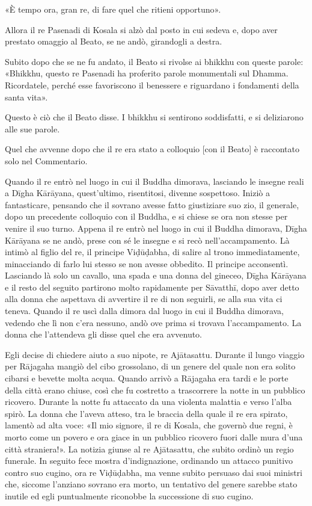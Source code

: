 «È tempo ora, gran re, di fare quel che ritieni opportuno».

Allora il re Pasenadi di Kosala si alzò dal posto in cui sedeva e, dopo aver
prestato omaggio al Beato, se ne andò, girandogli a destra.

Subito dopo che se ne fu andato, il Beato si rivolse ai bhikkhu con queste
parole: «Bhikkhu, questo re Pasenadi ha proferito parole monumentali sul Dhamma.
Ricordatele, perché esse favoriscono il benessere e riguardano i fondamenti
della santa vita».

Questo è ciò che il Beato disse. I bhikkhu si sentirono soddisfatti, e si
deliziarono alle sue parole.


 Quel che avvenne dopo che il re era stato a
colloquio [con il Beato] è raccontato solo nel Commentario.

 Quando il re entrò nel luogo in cui il Buddha
dimorava, lasciando le insegne reali a Dīgha Kārāyana, quest’ultimo,
risentitosi, divenne sospettoso. Iniziò a fantasticare, pensando che il sovrano
avesse fatto giustiziare suo zio, il generale, dopo un precedente colloquio con
il Buddha, e si chiese se ora non stesse per venire il suo turno. Appena il re
entrò nel luogo in cui il Buddha dimorava, Dīgha Kārāyana se ne andò, prese con
sé le insegne e si recò nell’accampamento. Là intimò al figlio del re, il
principe Viḍūḍabha, di salire al trono immediatamente, minacciando di farlo lui
stesso se non avesse obbedito. Il principe acconsentì. Lasciando là solo un
cavallo, una spada e una donna del gineceo, Dīgha Kārāyana e il resto del
seguito partirono molto rapidamente per Sāvatthī, dopo aver detto alla donna che
aspettava di avvertire il re di non seguirli, se alla sua vita ci teneva. Quando
il re uscì dalla dimora dal luogo in cui il Buddha dimorava, vedendo che lì non
c’era nessuno, andò ove prima si trovava l’accampamento. La donna che
l’attendeva gli disse quel che era avvenuto.

Egli decise di chiedere aiuto a suo nipote, re Ajātasattu. Durante il lungo
viaggio per Rājagaha mangiò del cibo grossolano, di un genere del quale non era
solito cibarsi e bevette molta acqua. Quando arrivò a Rājagaha era tardi e le
porte della città erano chiuse, così che fu costretto a trascorrere la notte in
un pubblico ricovero. Durante la notte fu attaccato da una violenta malattia e
verso l’alba spirò. La donna che l’aveva atteso, tra le braccia della quale il
re era spirato, lamentò ad alta voce: «Il mio signore, il re di Kosala, che
governò due regni, è morto come un povero e ora giace in un pubblico ricovero
fuori dalle mura d’una città straniera!». La notizia giunse al re Ajātasattu,
che subito ordinò un regio funerale. In seguito fece mostra d’indignazione,
ordinando un attacco punitivo contro suo cugino, ora re Viḍūḍabha, ma venne
subito persuaso dai suoi ministri che, siccome l’anziano sovrano era morto, un
tentativo del genere sarebbe stato inutile ed egli puntualmente riconobbe la
successione di suo cugino.


